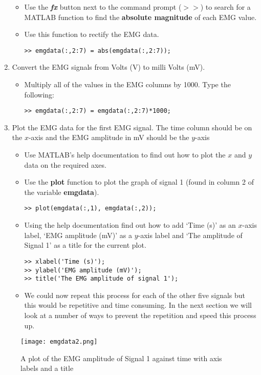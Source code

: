 \documentclass[12pt,a4paper]{article}
\begin{document}
\begin{enumerate}
\begin{itemize}
		\item Use the \textit{\textbf{fx}} button next to the command prompt ($>>$) to search for a MATLAB function to find the \textbf{absolute magnitude} of each EMG value.
		\item Use this function to rectify the EMG data.		
		\begin{lstlisting}[style=Matlab-editor]
>> emgdata(:,2:7) = abs(emgdata(:,2:7));
		\end{lstlisting}
	\end{itemize}
	\item Convert the EMG signals from Volts (V) to milli Volts (mV).
	\begin{itemize}
		\item Multiply all of the values in the EMG columns by 1000. 
		Type the following:
		\begin{lstlisting}[style=Matlab-editor]
>> emgdata(:,2:7) = emgdata(:,2:7)*1000;
		\end{lstlisting}
	\end{itemize}
	\item Plot the EMG data for the first EMG signal.  The time column should be on the $x$-axis and the EMG amplitude in mV should be the $y$-axis
	\begin{itemize}
		\item Use MATLAB's help documentation to find out how to plot the $x$ and $y$ data on the required axes.
		\item Use the \textbf{plot} function to plot the graph of signal 1 (found in column 2 of the variable \textbf{emgdata}).
		\begin{lstlisting}[style=Matlab-editor]
>> plot(emgdata(:,1), emgdata(:,2));
		\end{lstlisting}		
		\item Using the help documentation find out how to add `Time (s)' as an $x$-axis label, `EMG amplitude (mV)' as a $y$-axis label and `The amplitude of Signal 1' as a title for the current plot.
		\begin{lstlisting}[style=Matlab-editor]
>> xlabel('Time (s)');
>> ylabel('EMG amplitude (mV)');
>> title('The EMG amplitude of signal 1');
		\end{lstlisting}	
		\item We could now repeat this process for each of the other five signals but this would be repetitive and time consuming.  
		In the next section we will look at a number of ways to prevent the repetition and speed this process up.
	\end{itemize}
\end{enumerate}
\begin{figure}[H]
\begin{center}
\texttt{[image: emgdata2.png]}
\caption{A plot of the EMG amplitude of Signal 1 against time with axis labels and a title}
\label{fig:plot}
\end{center}
\end{figure}
\end{document}
